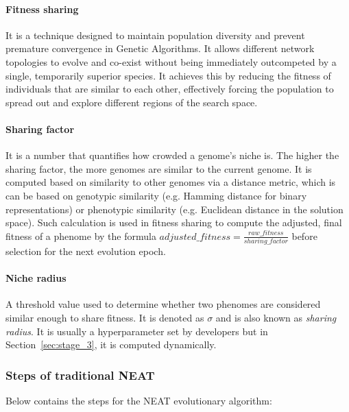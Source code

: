 \documentclass{article}
\begin{document}
\paragraph{Fitness sharing}
It is a technique designed to maintain population diversity and prevent premature convergence in Genetic Algorithms. It allows different network topologies to evolve and co-exist without being immediately outcompeted by a single, temporarily superior species. It achieves this by reducing the fitness of individuals that are similar to each other, effectively forcing the population to spread out and explore different regions of the search space. 

\paragraph{Sharing factor}
It is a number that quantifies how crowded a genome's niche is. The higher the sharing factor, the more genomes are similar to the current genome. It is computed based on similarity to other genomes via a distance metric, which is can be based on genotypic similarity (e.g. Hamming distance for binary representations) or phenotypic similarity (e.g. Euclidean distance in the solution space). Such calculation is used in fitness sharing to compute the adjusted, final fitness of a phenome by the formula $adjusted\_fitness = \frac{raw\_fitness}{sharing\_factor}$ before selection for the next evolution epoch. 

\paragraph{Niche radius}
A threshold value used to determine whether two phenomes are considered similar enough to share fitness. It is denoted as $\sigma$ and is also known as \textit{sharing radius}. It is usually a hyperparameter set by developers but in Section~\ref{sec:stage_3}, it is computed dynamically. 


\subsubsection{Steps of traditional NEAT}
Below contains the steps for the NEAT evolutionary algorithm: 
\end{document}
